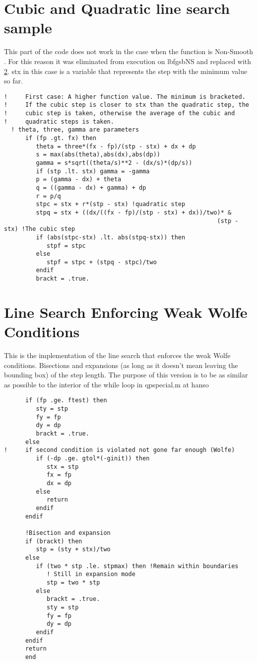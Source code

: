 \section{Cubic and Quadratic line search sample}
This part of the code does not work in the case when the function is Non-Smooth \label{nsnowork}. For this reason it was eliminated from execution on lbfgsbNS and replaced with \ref{linesearchww}. stx in this case is a variable that represents the step with the minimum value so far.
\lstset{
  firstnumber = 3881
}

\begin{lstlisting}
!     First case: A higher function value. The minimum is bracketed. 
!     If the cubic step is closer to stx than the quadratic step, the 
!     cubic step is taken, otherwise the average of the cubic and 
!     quadratic steps is taken.
  ! theta, three, gamma are parameters
      if (fp .gt. fx) then
         theta = three*(fx - fp)/(stp - stx) + dx + dp
         s = max(abs(theta),abs(dx),abs(dp))
         gamma = s*sqrt((theta/s)**2 - (dx/s)*(dp/s))
         if (stp .lt. stx) gamma = -gamma
         p = (gamma - dx) + theta
         q = ((gamma - dx) + gamma) + dp
         r = p/q
         stpc = stx + r*(stp - stx) !quadratic step
         stpq = stx + ((dx/((fx - fp)/(stp - stx) + dx))/two)* &
                                                            (stp - stx) !The cubic step
         if (abs(stpc-stx) .lt. abs(stpq-stx)) then
            stpf = stpc
         else
            stpf = stpc + (stpq - stpc)/two
         endif
         brackt = .true.
\end{lstlisting}

\section{Line Search Enforcing Weak Wolfe Conditions}\label{linesearchww}
This is the implementation of the line search that enforces the weak Wolfe conditions. Bisections and expansions (as long as it doesn't mean leaving the bounding box) of the step length. The purpose of this version is to be as similar as possible to the interior of the while loop in qpspecial.m at hanso \citep{hanso}
\lstset{
  firstnumber = 4425
}

\begin{lstlisting}
      if (fp .ge. ftest) then 
         sty = stp
         fy = fp
         dy = dp
         brackt = .true.
      else
!     if second condition is violated not gone far enough (Wolfe)
         if (-dp .ge. gtol*(-ginit)) then
            stx = stp
            fx = fp
            dx = dp
         else
            return
         endif
      endif   
      
      !Bisection and expansion
      if (brackt) then
         stp = (sty + stx)/two
      else
         if (two * stp .le. stpmax) then !Remain within boundaries
            ! Still in expansion mode
            stp = two * stp
         else
            brackt = .true.
            sty = stp
            fy = fp
            dy = dp
         endif
      endif
      return
      end
\end{lstlisting}

